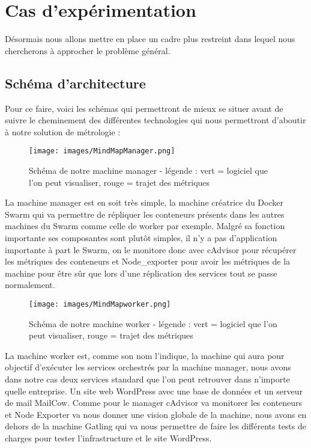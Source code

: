 \documentclass[oneside,12pt]{report}
\begin{document}
\chapter{Cas d'expérimentation}

Désormais nous allons mettre en place un cadre plus restreint dans lequel nous chercherons à approcher le problème général.

\section{Schéma d'architecture}

Pour ce faire, voici les schémas qui permettront de mieux se situer avant de suivre le cheminement des différentes technologies qui nous permettront d'aboutir à notre solution de métrologie :

\begin{figure}[!ht]
    \centering
    \texttt{[image: images/MindMapManager.png]}
    \caption{Schéma de notre machine manager - légende : vert = logiciel que l'on peut visualiser, rouge = trajet des métriques}
    \label{fig:mesh1}
\end{figure}

La machine manager est en soit très simple, la machine créatrice du Docker Swarm qui va permettre de répliquer les conteneurs présents dans les autres machines du Swarm comme celle de worker par exemple. Malgré sa fonction importante ses composantes sont plutôt simples, il n'y a pas d'application importante à part le Swarm, on le monitore donc avec cAdvisor pour récupérer les métriques des conteneurs et Node\_exporter pour avoir les métriques de la machine pour être sûr que lors d'une réplication des services tout se passe normalement. 

\begin{figure}[!ht]
    \centering
    \texttt{[image: images/MindMapworker.png]}
    \caption{Schéma de notre machine worker - légende : vert = logiciel que l'on peut visualiser, rouge = trajet des métriques}
    \label{fig:mesh1}
\end{figure}

La machine worker est, comme son nom l'indique, la machine qui aura pour objectif d'exécuter les services orchestrés par la machine manager, nous avons dans notre cas deux services standard que l'on peut retrouver dans n'importe quelle entreprise. Un site web WordPress avec une base de données et un serveur de mail MailCow. Comme pour le manager cAdvisor va monitorer les conteneurs et Node Exporter va nous donner une vision globale de la machine, nous avons en dehors de la machine Gatling qui va nous permettre de faire les différents tests de charges pour tester l'infrastructure et le site WordPress. 
\end{document}
